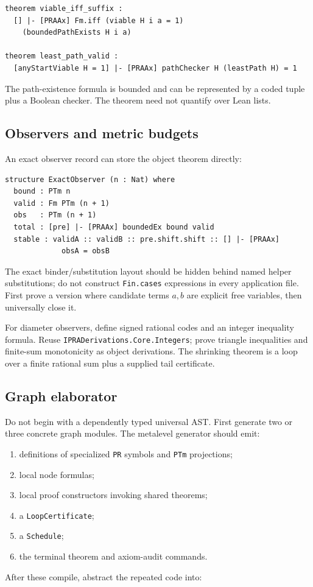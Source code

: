 \begin{lstlisting}
theorem viable_iff_suffix :
  [] |- [PRAAx] Fm.iff (viable H i a = 1)
    (boundedPathExists H i a)

theorem least_path_valid :
  [anyStartViable H = 1] |- [PRAAx] pathChecker H (leastPath H) = 1
\end{lstlisting}
The path-existence formula is bounded and can be represented by a coded tuple plus a Boolean checker.  The theorem need not quantify over Lean lists.

\subsection{Observers and metric budgets}

An exact observer record can store the object theorem directly:

\begin{lstlisting}
structure ExactObserver (n : Nat) where
  bound : PTm n
  valid : Fm PTm (n + 1)
  obs   : PTm (n + 1)
  total : [pre] |- [PRAAx] boundedEx bound valid
  stable : validA :: validB :: pre.shift.shift :: [] |- [PRAAx]
             obsA = obsB
\end{lstlisting}
The exact binder/substitution layout should be hidden behind named helper substitutions; do not construct \texttt{Fin.cases} expressions in every application file.  First prove a version where candidate terms \(a,b\) are explicit free variables, then universally close it.

For diameter observers, define signed rational codes and an integer inequality formula.  Reuse \texttt{IPRADerivations.Core.Integers}; prove triangle inequalities and finite-sum monotonicity as object derivations.  The shrinking theorem is a loop over a finite rational sum plus a supplied tail certificate.

\subsection{Graph elaborator}

Do not begin with a dependently typed universal AST.  First generate two or three concrete graph modules.  The metalevel generator should emit:
\begin{enumerate}[label=(\arabic*)]
  \item definitions of specialized \texttt{PR} symbols and \texttt{PTm} projections;
  \item local node formulas;
  \item local proof constructors invoking shared theorems;
  \item a \texttt{LoopCertificate};
  \item a \texttt{Schedule};
  \item the terminal theorem and axiom-audit commands.
\end{enumerate}
After these compile, abstract the repeated code into:

